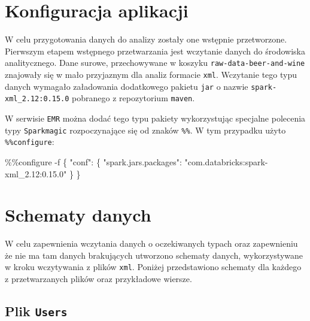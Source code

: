 \documentclass[
  letterpaper,
  DIV=11,
  numbers=noendperiod]{scrreprt}
\newenvironment{Shaded}{\begin{snugshade}}{\end{snugshade}}
\newcommand{\NormalTok}[1]{\textcolor[rgb]{0.00,0.23,0.31}{#1}}
\newcommand{\OperatorTok}[1]{\textcolor[rgb]{0.37,0.37,0.37}{#1}}
\newcommand{\StringTok}[1]{\textcolor[rgb]{0.13,0.47,0.30}{#1}}
\begin{document}
\hypertarget{konfiguracja-aplikacji}{%
\section{Konfiguracja aplikacji}\label{konfiguracja-aplikacji}}

W celu przygotowania danych do analizy zostały one wstępnie
przetworzone. Pierwszym etapem wstępnego przetwarzania jest wczytanie
danych do środowiska analitycznego. Dane surowe, przechowywane w koszyku
\texttt{raw-data-beer-and-wine} znajowały się w mało przyjaznym dla
analiz formacie \texttt{xml}. Wczytanie tego typu danych wymagało
załadowania dodatkowego pakietu \texttt{jar} o nazwie
\texttt{spark-xml\_2.12:0.15.0} pobranego z repozytorium \texttt{maven}.

W serwisie \texttt{EMR} można dodać tego typu pakiety wykorzystując
specjalne polecenia typy \texttt{Sparkmagic} rozpoczynające się od
znaków \texttt{\%\%}. W tym przypadku użyto \texttt{\%\%configure}:

\small

\begin{Shaded}
\begin{Highlighting}[]
\OperatorTok{\%\%}\NormalTok{configure }\OperatorTok{{-}}\NormalTok{f}
\NormalTok{\{}
    \StringTok{"conf"}\NormalTok{: \{}
        \StringTok{"spark.jars.packages"}\NormalTok{: }\StringTok{"com.databricks:spark{-}xml\_2.12:0.15.0"}
\NormalTok{    \}}
\NormalTok{\}}
\end{Highlighting}
\end{Shaded}

\normalsize

\hypertarget{schematy-danych}{%
\section{Schematy danych}\label{schematy-danych}}

W celu zapewnienia wczytania danych o oczekiwanych typach oraz
zapewnieniu że nie ma tam danych brakujących utworzono schematy danych,
wykorzystywane w kroku wczytywania z plików \texttt{xml}. Poniżej
przedstawiono schematy dla każdego z przetwarzanych plików oraz
przykładowe wiersze.

\hypertarget{plik-users}{%
\subsection{\texorpdfstring{Plik
\texttt{Users}}{Plik Users}}\label{plik-users}}
\end{document}

